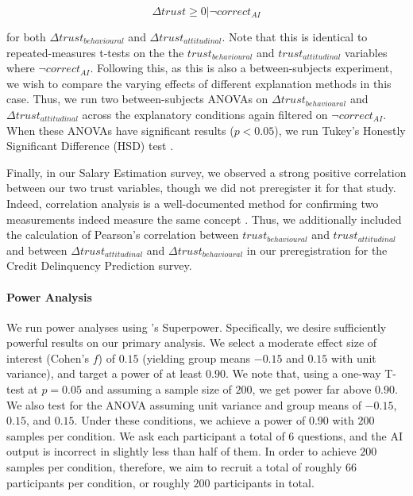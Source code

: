 \begin{equation}
    \Delta trust \geq 0 | \neg correct_{AI}
\end{equation}

\noindent for both $\Delta trust_{behavioural}$ and $\Delta trust_{attitudinal}$. Note that this is identical to repeated-measures t-tests on the the $trust_{behavioural}$ and $trust_{attitudinal}$ variables where $\neg correct_{AI}$. Following this, as this is also a between-subjects experiment, we wish to compare the varying effects of different explanation methods in this case. Thus, we run two between-subjects ANOVAs \cite{caldwell_power_nodate} on $\Delta trust_{behavioural}$ and $\Delta trust_{attitudinal}$ across the explanatory conditions again filtered on $\neg correct_{AI}$. When these ANOVAs have significant results ($p < 0.05$), we run Tukey's Honestly Significant Difference (HSD) test \cite{caldwell_power_nodate}.

Finally, in our Salary Estimation survey, we observed a strong positive correlation between our two trust variables, though we did not preregister it for that study. Indeed, correlation analysis is a well-documented method for confirming two measurements indeed measure the same concept \cite{westen_quantifying_2003, morata-ramirez_construct_2013}. Thus, we additionally included the calculation of Pearson's correlation between $trust_{behavioural}$ and $trust_{attitudinal}$ and between $\Delta trust_{attitudinal}$ and $\Delta trust_{behavioural}$ in our preregistration for the Credit Delinquency Prediction survey. 

\paragraph{Power Analysis}
We run power analyses using \textcite{caldwell_power_nodate}'s Superpower. Specifically, we desire sufficiently powerful results on our primary analysis. We select a moderate effect size of interest (Cohen’s $f$) of $0.15$ (yielding group means $-0.15$ and $0.15$ with unit variance), and target a power of at least $0.90$. We note that, using a one-way T-test at $p = 0.05$ and assuming a sample size of $200$, we get power far above $0.90$. We also test for the ANOVA assuming unit variance and group means of $-0.15$, $0.15$, and $0.15$. Under these conditions, we achieve a power of $0.90$ with $200$ samples per condition. We ask each participant a total of 6 questions, and the AI output is incorrect in slightly less than half of them. In order to achieve $200$ samples per condition, therefore, we aim to recruit a total of roughly $66$ participants per condition, or roughly $200$ participants in total.


